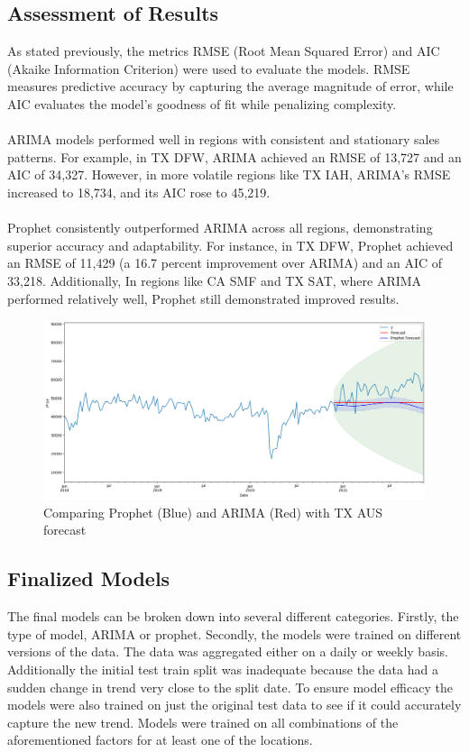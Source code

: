 \documentclass{article}
\begin{document}
    \subsection{Assessment of Results}
        As stated previously, the metrics RMSE (Root Mean Squared Error) and AIC (Akaike Information 
        Criterion) were used to evaluate the models. RMSE measures predictive accuracy by capturing 
        the average magnitude of error, while AIC evaluates the model’s goodness of fit while 
        penalizing complexity. \\
        \\
        ARIMA models performed well in regions with consistent and stationary sales patterns. For 
        example, in TX DFW, ARIMA achieved an RMSE of 13,727 and an AIC of 34,327. However, 
        in more volatile regions like TX IAH, ARIMA’s RMSE increased to 18,734, and its AIC 
        rose to 45,219. \\
        \\
        Prophet consistently outperformed ARIMA across all regions, demonstrating superior 
        accuracy and adaptability. For instance, in TX DFW, Prophet achieved an RMSE of 11,429 
        (a 16.7 percent improvement over ARIMA) and an AIC of 33,218. Additionally, In regions like 
        CA SMF and TX SAT, where ARIMA performed relatively well, Prophet still demonstrated 
        improved results.
        \begin{figure}[H]
            \centering
            \includegraphics[width=0.85\linewidth]{assets/Model-Comparison.png}
            \caption{Comparing Prophet (Blue) and ARIMA (Red) with TX AUS forecast}
            \label{fig:Model-Comparison}
        \end{figure}
    \subsection{Finalized Models}
        The final models can be broken down into several different categories. Firstly, the type of 
        model, ARIMA or prophet. Secondly, the models were trained on different versions of the data.
        The data was aggregated either on a daily or weekly basis. Additionally the initial test train
        split was inadequate because the data had a sudden change in trend very close to the split date.
        To ensure model efficacy the models were also trained on just the original test data to see if it
        could accurately capture the new trend. Models were trained on all combinations of the aforementioned
        factors for at least one of the locations.
\end{document}
